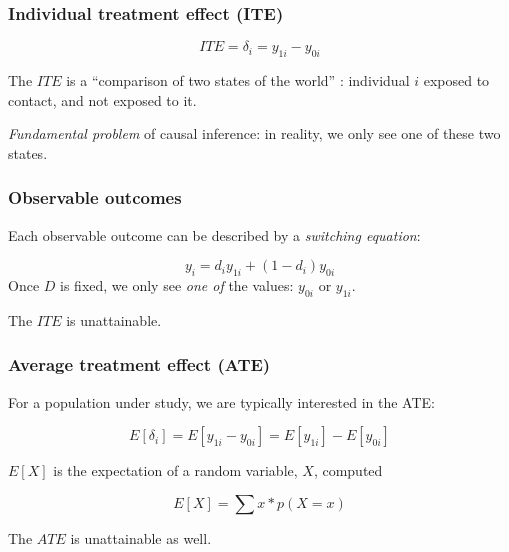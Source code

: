 \documentclass[12pt,english,dvipsnames,aspectratio=169,handout]{beamer}\usepackage[]{graphicx}\usepackage[]{xcolor}
\begin{document}
\begin{frame}
	\frametitle{Individual treatment effect (ITE)}
  
  \begin{equation}
    ITE = \delta_i= y_{1i} - y_{0i}
  \label{eq:01}
  \end{equation}
  
  The $ITE$ is a ``comparison of two states of the world'' \cite{cunningham_causal_2021}: individual $i$ exposed to contact, and not exposed to it.\bigskip
  \pause

  \textit{Fundamental problem} \cite{holland_statistics_1986} of causal inference: in reality, we only see one of these two states.

\end{frame}


\begin{frame}
  \frametitle{Observable outcomes}
  
  Each observable outcome can be described by a \textit{switching equation}:
  
  \begin{equation}
    y_i = d_iy_{1i} + (1 - d_i)y_{0i}
  \label{eq:02}
  \end{equation}\bigskip
  \pause
  Once $D$ is fixed, we only see \textit{one of} the values: $y_{0i}$ or $y_{1i}$.\bigskip
  
  The $ITE$ is unattainable.
\end{frame}


\begin{frame}
  \frametitle{Average treatment effect (ATE)}
  
  For a population under study, we are typically interested in the ATE:
  
  \begin{equation}
  E[\delta_i] = E[y_{1i} - y_{0i}] = E[y_{1i}] - E[y_{0i}]
    \label{eq:03}
  \end{equation}\bigskip
  \pause
  
  $E[X]$ is the expectation of a random variable, $X$, computed
  
  \begin{equation}
  E[X] = \sum x*p(X=x)
    \label{eq:04}
  \end{equation}
  
  The $ATE$ is unattainable as well.
  
\end{frame}
\end{document}
